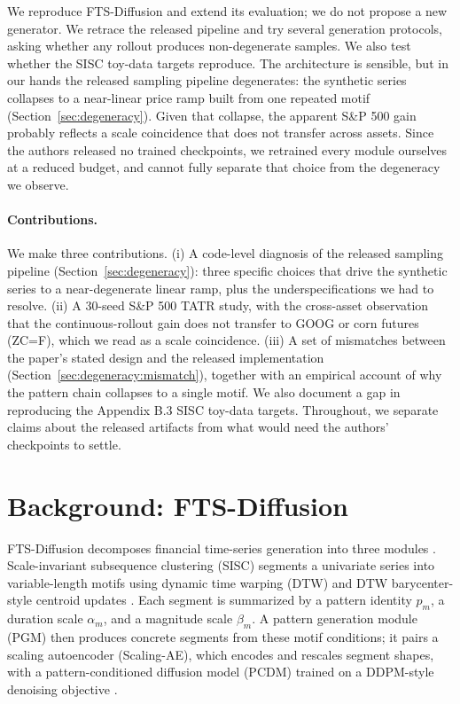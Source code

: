 \documentclass{article}
\begin{document}
We reproduce FTS-Diffusion and extend its evaluation; we do not propose a new generator. We retrace the released pipeline and try several generation protocols, asking whether any rollout produces non-degenerate samples. We also test whether the SISC toy-data targets reproduce. The architecture is sensible, but in our hands the released sampling pipeline degenerates: the synthetic series collapses to a near-linear price ramp built from one repeated motif (Section~\ref{sec:degeneracy}). Given that collapse, the apparent S\&P 500 gain probably reflects a scale coincidence that does not transfer across assets. Since the authors released no trained checkpoints, we retrained every module ourselves at a reduced budget, and cannot fully separate that choice from the degeneracy we observe.

\paragraph{Contributions.}
We make three contributions. (i) A code-level diagnosis of the released sampling pipeline (Section~\ref{sec:degeneracy}): three specific choices that drive the synthetic series to a near-degenerate linear ramp, plus the underspecifications we had to resolve. (ii) A 30-seed S\&P 500 TATR study, with the cross-asset observation that the continuous-rollout gain does not transfer to GOOG or corn futures (ZC=F), which we read as a scale coincidence. (iii) A set of mismatches between the paper's stated design and the released implementation (Section~\ref{sec:degeneracy:mismatch}), together with an empirical account of why the pattern chain collapses to a single motif. We also document a gap in reproducing the Appendix B.3 SISC toy-data targets. Throughout, we separate claims about the released artifacts from what would need the authors' checkpoints to settle.

\section{Background: FTS-Diffusion}

FTS-Diffusion decomposes financial time-series generation into three modules \citep{huang2024fts}. Scale-invariant subsequence clustering (SISC) segments a univariate series into variable-length motifs using dynamic time warping (DTW) \citep{sakoe1978dtw} and DTW barycenter-style centroid updates \citep{petitjean2011dba}. Each segment is summarized by a pattern identity $p_m$, a duration scale $\alpha_m$, and a magnitude scale $\beta_m$. A pattern generation module (PGM) then produces concrete segments from these motif conditions; it pairs a scaling autoencoder (Scaling-AE), which encodes and rescales segment shapes, with a pattern-conditioned diffusion model (PCDM) trained on a DDPM-style denoising objective \citep{ho2020ddpm}.
\end{document}
